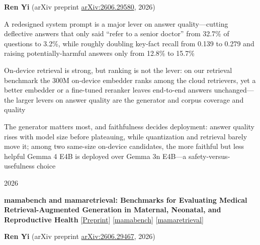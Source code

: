         \vspace{0.10 cm}
        \begin{onecolentry}
            \textbf{Ren Yi} (arXiv preprint \href{https://arxiv.org/abs/2606.29580}{arXiv:2606.29580}, 2026)
        \end{onecolentry}
        \vspace{0.10 cm}

        \begin{onecolentry}
        \begin{highlights}
            \item A redesigned system prompt is a major lever on answer quality---cutting deflective answers that only said ``refer to a senior doctor'' from 32.7\% of questions to 3.2\%, while roughly doubling key-fact recall from 0.139 to 0.279 and raising potentially-harmful answers only from 12.8\% to 15.7\%
            \item On-device retrieval is strong, but ranking is not the lever: on our retrieval benchmark the 300M on-device embedder ranks among the cloud retrievers, yet a better embedder or a fine-tuned reranker leaves end-to-end answers unchanged---the larger levers on answer quality are the generator and corpus coverage and quality
            \item The generator matters most, and faithfulness decides deployment: answer quality rises with model size before plateauing, while quantization and retrieval barely move it; among two same-size on-device candidates, the more faithful but less helpful Gemma 4 E4B is deployed over Gemma 3n E4B---a safety-versus-usefulness choice
        \end{highlights}
        \end{onecolentry}

        \vspace{0.2 cm}
        \begin{twocolentry}[0.9 cm] {2026}

\textbf{mamabench and mamaretrieval: Benchmarks for Evaluating Medical Retrieval-Augmented Generation in Maternal, Neonatal, and Reproductive Health} \mbox{[\href{https://arxiv.org/abs/2606.29467}{Preprint}]} \mbox{[\href{https://huggingface.co/datasets/nmrenyi/mamabench}{mamabench}]} \mbox{[\href{https://huggingface.co/datasets/nmrenyi/mamaretrieval}{mamaretrieval}]}

\end{twocolentry}

        \vspace{0.10 cm}
        \begin{onecolentry}
            \textbf{Ren Yi} (arXiv preprint \href{https://arxiv.org/abs/2606.29467}{arXiv:2606.29467}, 2026)
        \end{onecolentry}
        \vspace{0.10 cm}

